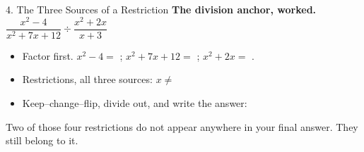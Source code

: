 \documentclass[10pt]{article}
\begin{document}
\begin{notesbox}{4. The Three Sources of a Restriction}
\vspace{5pt}
\textbf{The division anchor, worked.} \; $\dfrac{x^2-4}{x^2+7x+12}\div\dfrac{x^2+2x}{x+3}$
\begin{itemize}[leftmargin=1.5em, itemsep=3pt]
  \item Factor first. \; $x^2-4=$ ; \quad $x^2+7x+12=$ ; \quad
        $x^2+2x=$ .
  \item Restrictions, all three sources: $x\neq$ 
  \item Keep--change--flip, divide out, and write the answer: 
\end{itemize}
Two of those four restrictions do not appear anywhere in your final answer. They still belong to it.
\end{notesbox}
\end{document}
